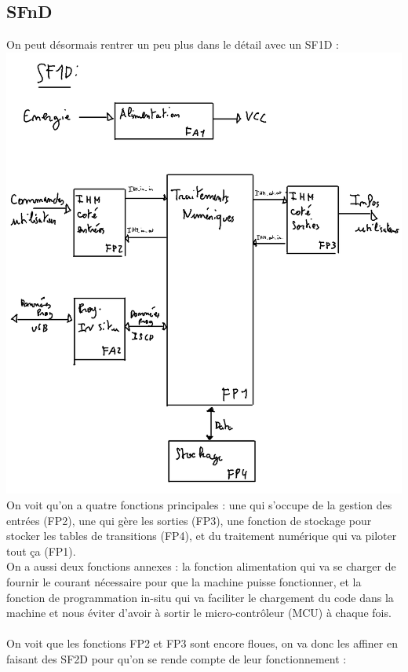\documentclass[12pt]{report}
\begin{document}
	\subsection{SFnD}
	On peut désormais rentrer un peu plus dans le détail avec un SF1D :\\
	\includegraphics[width=\textwidth]{img/SF1D}
	On voit qu'on a quatre fonctions principales : une qui s'occupe de la gestion des entrées (FP2), une qui gère les sorties (FP3), une fonction de stockage pour stocker les tables de transitions (FP4), et du traitement numérique qui va piloter tout ça (FP1).\\
	On a aussi deux fonctions annexes : la fonction alimentation qui va se charger de fournir le courant nécessaire pour que la machine puisse fonctionner, et la fonction de programmation in-situ qui va faciliter le chargement du code dans la machine et nous éviter d'avoir à sortir le micro-contrôleur (MCU) à chaque fois.\\
	\\
	On voit que les fonctions FP2 et FP3 sont encore floues, on va donc les affiner en faisant des SF2D pour qu'on se rende compte de leur fonctionnement :\\
\end{document}
